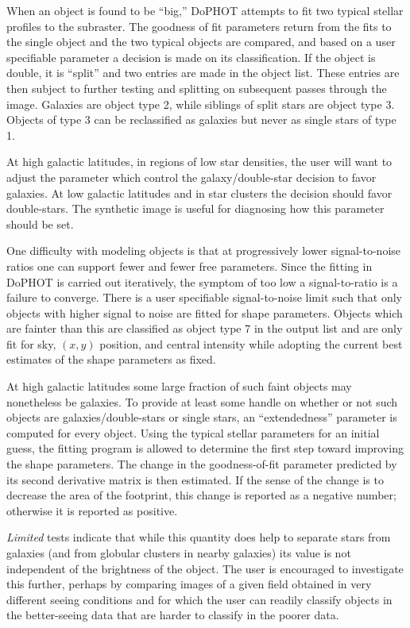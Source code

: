 When an object is found to be ``big,'' DoPHOT attempts to
fit two typical stellar profiles to the subraster.  The
goodness of fit parameters return from the fits to the
single object and the two typical objects are compared, and
based on a user specifiable parameter a decision is made on
its classification.  If the object is double, it is
``split'' and two entries are made in the object list.
These entries are then subject to further testing and
splitting on subsequent passes through the image.  Galaxies
are object type 2, while siblings of split stars are object
type 3.  Objects of type 3 can be reclassified as galaxies
but never as single stars of type 1.

At high galactic latitudes, in regions of low star
densities, the user will want to adjust the parameter
which control the galaxy/double-star decision to
favor galaxies.   At low galactic latitudes and
in star clusters the decision should favor double-stars.
The synthetic image is useful for diagnosing how this
parameter should be set.

One difficulty with modeling objects is that at
progressively lower signal-to-noise ratios one can support
fewer and fewer free parameters.  Since the fitting in
DoPHOT is carried out iteratively, the symptom of too low a
signal-to-ratio is a failure to converge.  There is a user
specifiable signal-to-noise limit such that only objects
with higher signal to noise are fitted for shape parameters.
Objects which are fainter than this are classified as object
type 7 in the output list and are only fit for sky, $(x,y)$ position,
and central intensity while adopting the current best estimates of
the shape parameters as fixed.

At high galactic latitudes some large fraction of such faint
objects may nonetheless be galaxies.  To provide at least
some handle on whether or not such objects are
galaxies/double-stars or single stars, an ``extendedness''
parameter is computed for every object.  Using the typical
stellar parameters for an initial guess, the fitting program
is allowed to determine the first step toward improving the
shape parameters.  The change in the goodness-of-fit parameter
predicted by its second derivative matrix is then estimated.
If the sense of the change is to decrease the area of the
footprint, this change is reported as a negative number;
otherwise it is reported as positive.  

{\it Limited} tests indicate that while this quantity does
help to separate stars from galaxies (and from globular
clusters in nearby galaxies) its value is not independent
of the brightness of the object.  The user is encouraged
to investigate this further, perhaps by comparing images of a given
field obtained in very different seeing conditions and for which the
user can readily classify objects in the better-seeing data that are
harder to classify in the poorer data.


